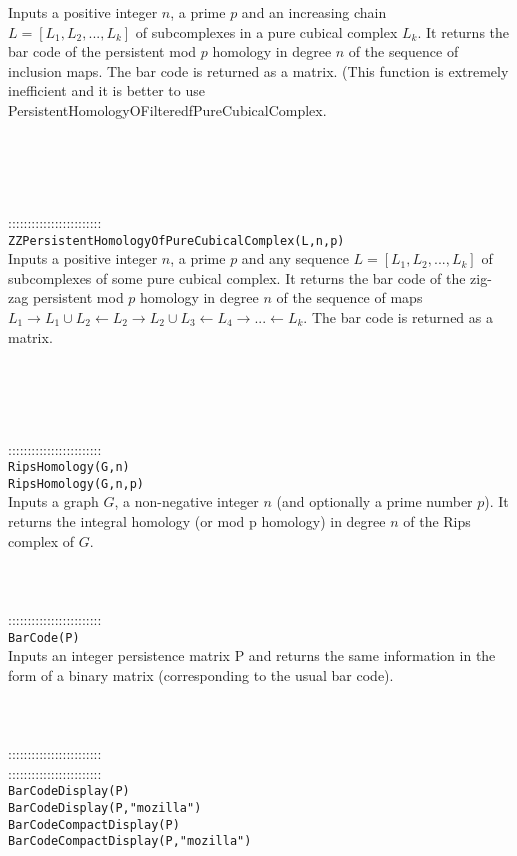 \documentclass[a4paper,11pt]{report}
\begin{document}
{ Inputs a positive integer $n$, a prime $p$ and an increasing chain $L=[L_1, L_2, ..., L_k]$ of subcomplexes in a pure cubical complex $L_k$. It returns the bar code of the persistent mod $p$ homology in degree $n$ of the sequence of inclusion maps. The bar code is returned as a matrix. (This
function is extremely inefficient and it is better to use
PersistentHomologyOFilteredfPureCubicalComplex. 

 \\
 \\
 \\
 \\
 ::::::::::::::::::::::::\\
 \texttt{ZZPersistentHomologyOfPureCubicalComplex(L,n,p)}\\
 

 Inputs a positive integer $n$, a prime $p$ and any sequence $L=[L_1, L_2, ..., L_k]$ of subcomplexes of some pure cubical complex. It returns the bar code of the
zig-zag persistent mod $p$ homology in degree $n$ of the sequence of maps $L_1 \rightarrow L_1 \cup L_2 \leftarrow L_2 \rightarrow L_2 \cup L_3
\leftarrow L_4 \rightarrow ... \leftarrow L_k$. The bar code is returned as a matrix. 

 \\
 \\
 \\
 \\
 ::::::::::::::::::::::::\\
 \texttt{RipsHomology(G,n)}\\
 \texttt{RipsHomology(G,n,p)}\\
 

 Inputs a graph $G$, a non-negative integer $n$ (and optionally a prime number $p$). It returns the integral homology (or mod p homology) in degree $n$ of the Rips complex of $G$. \\
 \\
 \\
 \\
 ::::::::::::::::::::::::\\
 \texttt{BarCode(P)}\\
 

 Inputs an integer persistence matrix P and returns the same information in the
form of a binary matrix (corresponding to the usual bar code). \\
 \\
 \\
 \\
 ::::::::::::::::::::::::\\
 ::::::::::::::::::::::::\\
 \texttt{BarCodeDisplay(P)}\\
 \texttt{BarCodeDisplay(P,"mozilla")}\\
 \texttt{BarCodeCompactDisplay(P)}\\
 \texttt{BarCodeCompactDisplay(P,"mozilla")}\\
 

}
\end{document}
